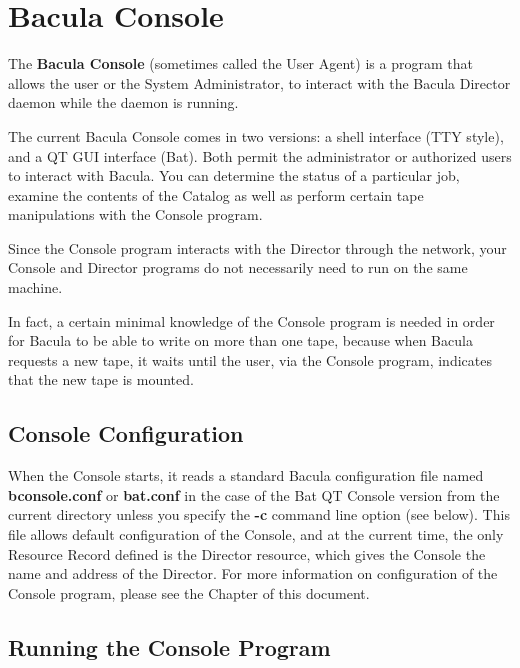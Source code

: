 
\chapter{Bacula Console}
\label{_ConsoleChapter}

The {\bf Bacula Console} (sometimes called the User Agent) is a program that
allows the user or the System Administrator, to interact with the Bacula
Director daemon while the daemon is running.

The current Bacula Console comes in two versions: a shell interface (TTY
style), and a QT GUI interface (Bat). Both permit the administrator or
authorized users to interact with Bacula. You can determine the status of a
particular job, examine the contents of the Catalog as well as perform certain
tape manipulations with the Console program.

Since the Console program interacts with the Director through the network, your
Console and Director programs do not necessarily need to run on the same
machine.

In fact, a certain minimal knowledge of the Console program is needed in order
for Bacula to be able to write on more than one tape, because when Bacula
requests a new tape, it waits until the user, via the Console program,
indicates that the new tape is mounted.

\section{Console Configuration}

When the Console starts, it reads a standard Bacula configuration file
named {\bf bconsole.conf} or {\bf bat.conf} in the case of the Bat
QT Console version from the current directory unless you specify the {\bf {-}c}
command line option (see below). This file allows default configuration
of the Console, and at the current time, the only Resource Record defined
is the Director resource, which gives the Console the name and address of
the Director.  For more information on configuration of the Console
program, please see the  Chapter of this document.

\section{Running the Console Program}

